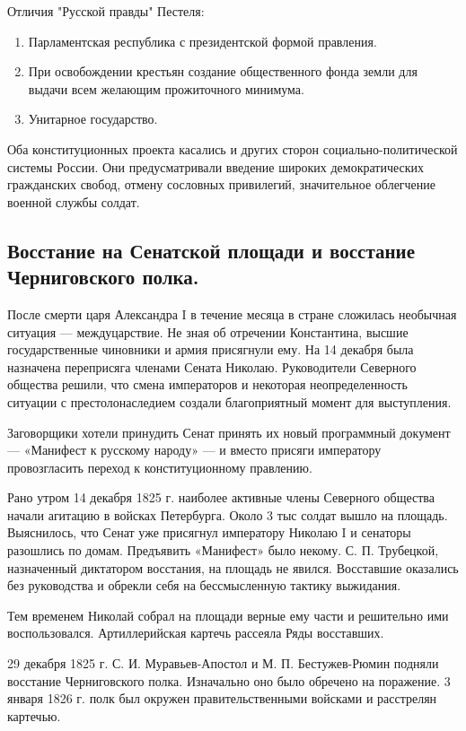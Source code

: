 Отличия "Русской правды" Пестеля:

\begin{enumerate}
    \item{Парламентская республика с президентской формой правления.}
    \item{При освобождении крестьян создание общественного фонда земли для выдачи всем желающим прожиточного минимума.}
    \item{Унитарное государство.}
\end{enumerate}

Оба конституционных проекта касались и других сторон социально-политической системы России. Они предусматривали введение широких демократических гражданских свобод, отмену сословных привилегий, значительное облегчение военной службы солдат.

\subsection{Восстание на Сенатской площади и восстание Черниговского полка.}

После смерти царя Александра I в течение месяца в стране сложилась необычная ситуация — междуцарствие. Не зная об отречении Константина, высшие государственные чиновники и армия присягнули ему. На 14 декабря была назначена переприсяга членами Сената Николаю. Руководители Северного общества решили, что смена императоров и некоторая неопределенность ситуации с престолонаследием создали благоприятный момент для выступления.

Заговорщики хотели принудить Сенат принять их новый программный документ — «Манифест к русскому народу» — и вместо присяги императору провозгласить переход к конституционному правлению.

Рано утром 14 декабря 1825 г. наиболее активные члены Северного общества начали агитацию в войсках Петербурга. Около 3 тыс солдат вышло на площадь. Выяснилось, что Сенат уже присягнул императору Николаю I и сенаторы разошлись по домам. Предъявить «Манифест» было некому. С. П. Трубецкой, назначенный диктатором восстания, на площадь не явился. Восставшие оказались без руководства и обрекли себя на бессмысленную тактику выжидания.

Тем временем Николай собрал на площади верные ему части и решительно ими воспользовался. Артиллерийская картечь рассеяла Ряды восставших.

29 декабря 1825 г. С. И. Муравьев-Апостол и М. П. Бестужев-Рюмин подняли восстание Черниговского полка. Изначально оно было обречено на поражение. 3 января 1826 г. полк был окружен правительственными войсками и расстрелян картечью.

